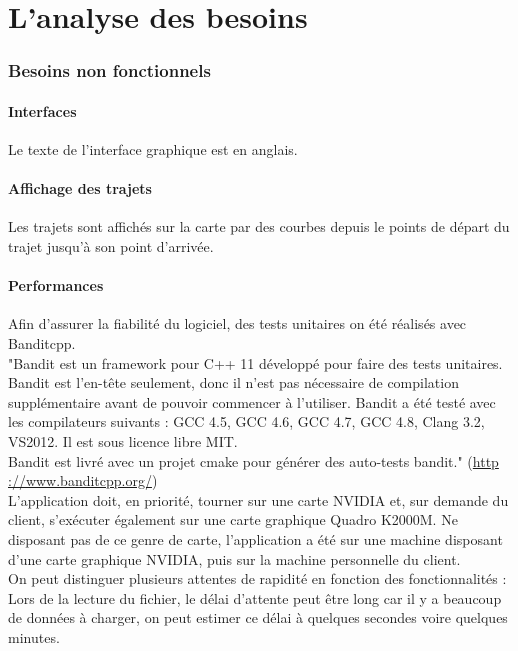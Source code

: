 \documentclass[12pt]{article}
\begin{document}
\newpage
\part{L'analyse des besoins}
	\section{Besoins non fonctionnels}
		\subsection{Interfaces}
		Le texte de l’interface graphique est en anglais.

		\subsection{Affichage des trajets}
		Les trajets sont affichés sur la carte par des courbes depuis le points de départ du
		trajet jusqu’à son point d’arrivée.

		\subsection{Performances}
		Afin d’assurer la fiabilité du logiciel, des tests unitaires on été réalisés avec
		Banditcpp.\\
		"Bandit est un framework pour C++ 11 développé pour faire des tests unitaires. Bandit est
		l’en-tête seulement, donc il n’est pas nécessaire de compilation supplémentaire avant de
		pouvoir commencer à l’utiliser. Bandit a été testé avec les compilateurs suivants :
		GCC 4.5, GCC 4.6, GCC 4.7, GCC 4.8, Clang 3.2, VS2012.
		Il est sous licence libre MIT. \\
		Bandit est livré avec un projet cmake pour générer des auto-tests bandit."
		(\url{http ://www.banditcpp.org/})\\
	
		L’application doit, en priorité, tourner sur une carte NVIDIA et,
		sur demande du client, s’exécuter également sur une carte graphique Quadro K2000M. Ne 
		disposant pas de ce genre de carte, l'application a été sur une machine 
		disposant d'une carte graphique NVIDIA, puis sur la machine personnelle du client. \\
		
		On peut distinguer plusieurs attentes de rapidité en fonction des fonctionnalités :
		Lors de la lecture du fichier, le délai d’attente peut être long car il y a
		beaucoup de données à charger, on peut estimer ce délai à quelques secondes voire
		quelques minutes. \\
		
\end{document}
